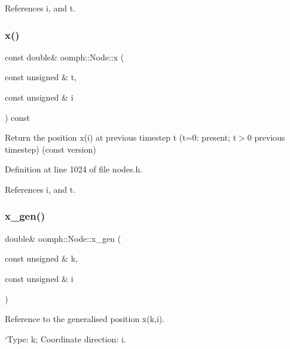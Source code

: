 References i, and t.

\mbox{\label{classoomph_1_1Node_aa3f5b3d40e4b59d760435d1fee000c48}} 
\subsubsection{\texorpdfstring{x()}{x()}\hspace{0.1cm}{\footnotesize\ttfamily [4/4]}}
{\footnotesize\ttfamily const double\& oomph\+::\+Node\+::x (\begin{DoxyParamCaption}\item[{const unsigned \&}]{t,  }\item[{const unsigned \&}]{i }\end{DoxyParamCaption}) const\hspace{0.3cm}{\ttfamily [inline]}}



Return the position x(i) at previous timestep t (t=0\+: present; t$>$0 previous timestep) (const version) 



Definition at line 1024 of file nodes.\+h.



References i, and t.

\mbox{\label{classoomph_1_1Node_a072d2dc645e03ccd18061a5c616aa6af}} 
\subsubsection{\texorpdfstring{x\+\_\+gen()}{x\_gen()}\hspace{0.1cm}{\footnotesize\ttfamily [1/4]}}
{\footnotesize\ttfamily double\& oomph\+::\+Node\+::x\+\_\+gen (\begin{DoxyParamCaption}\item[{const unsigned \&}]{k,  }\item[{const unsigned \&}]{i }\end{DoxyParamCaption})\hspace{0.3cm}{\ttfamily [inline]}}



Reference to the generalised position x(k,i). 

`\+Type\textquotesingle{}\+: k; Coordinate direction\+: i. 

